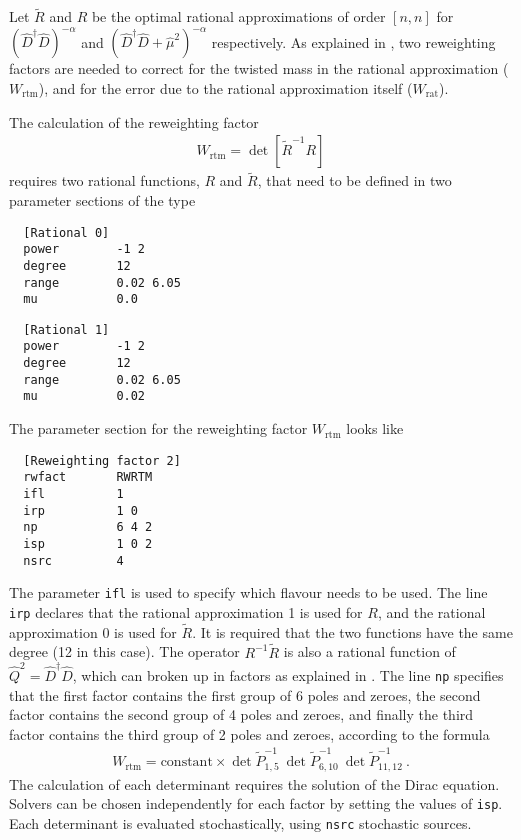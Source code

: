 \documentclass[11pt,fleqn]{article}
\newcommand{\Rmu}{R}
\newcommand{\R}{\tilde{R}}
\begin{document}
Let $\R$ and $\Rmu$ be the optimal rational approximations of order $[n,n]$ for
$(\hat{D}^\dag \hat{D})^{-\alpha}$ and $(\hat{D}^\dag \hat{D} +
\hat{\mu}^2)^{-\alpha}$ respectively. As explained in \cite{rhmc}, two
reweighting factors are needed to correct for the twisted mass in the rational
approximation ($W_\text{rtm}$), and for the error due to the rational
approximation itself ($W_\text{rat}$).


The calculation of the reweighting factor
%
\begin{gather}
   W_\text{rtm} = \det [ \R^{-1} \Rmu ]
   \label{eq:Wtm}
\end{gather}
%
requires two rational functions, $\Rmu$ and $\R$, that need to be defined in two
parameter sections of the type
%
\begin{verbatim}
  [Rational 0]
  power        -1 2
  degree       12
  range        0.02 6.05
  mu           0.0
\end{verbatim}

\begin{verbatim}
  [Rational 1]
  power        -1 2
  degree       12
  range        0.02 6.05
  mu           0.02
\end{verbatim}
%
The parameter section for the reweighting factor $W_\text{rtm}$ looks like
%
\begin{verbatim}
  [Reweighting factor 2]
  rwfact       RWRTM
  ifl          1
  irp          1 0
  np           6 4 2
  isp          1 0 2
  nsrc         4
\end{verbatim}
%
The parameter \texttt{ifl} is used to specify which flavour needs to be used.
The line \texttt{irp} declares that the rational approximation 1 is used for
$\Rmu$, and the rational approximation 0 is used for $\R$. It is required that
the two functions have the same degree (12 in this case). The operator
$\Rmu^{-1} \R$ is also a rational function of $\hat{Q}^2=\hat{D}^\dag \hat{D}$,
which can broken up in factors as explained in \cite{rhmc}. The line \texttt{np}
specifies that the first factor contains the first group of 6 poles and zeroes,
the second factor contains the second group of 4 poles and zeroes, and finally
the third factor contains the third group of 2 poles and zeroes, according to
the formula
%
\begin{gather}
   W_\text{rtm} = \text{constant} \times \det \tilde{P}_{1,5}^{-1} \ \det \tilde{P}_{6,10}^{-1} \ \det \tilde{P}_{11,12}^{-1} \ .
\end{gather}
%
The calculation of each determinant requires the solution of the Dirac equation.
Solvers can be chosen independently for each factor by setting the values of
\texttt{isp}. Each determinant is evaluated stochastically, using \texttt{nsrc}
stochastic sources.
\end{document}
